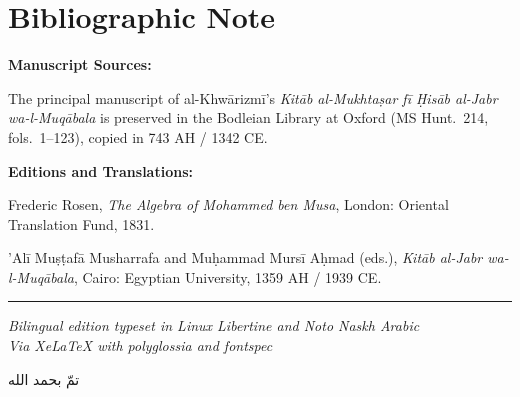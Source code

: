 \documentclass[11pt,a4paper,openany,oneside]{book}
\begin{document}
\chapter*{Bibliographic Note}

\begin{small}
\textbf{Manuscript Sources:}

The principal manuscript of al-Khw\=arizm\={i}'s \textit{Kit\=ab al-Mukhta\d{s}ar
f\={i} \d{H}is\=ab al-Jabr wa-l-Muq\=abala} is preserved in the Bodleian
Library at Oxford (MS Hunt.~214, fols.~1--123), copied in 743 AH / 1342 CE.

\vspace{0.3cm}

\textbf{Editions and Translations:}

\begin{enumerate}[label={[\arabic*]},leftmargin=2em]
  \item Frederic Rosen, \textit{The Algebra of Mohammed ben Musa}, London:
  Oriental Translation Fund, 1831.
  \item 'Al\={i} Mu\d{s}\d{t}af\=a Musharrafa and Mu\d{h}ammad Murs\={i} A\d{h}mad
  (eds.), \textit{Kit\=ab al-Jabr wa-l-Muq\=abala}, Cairo: Egyptian
  University, 1359 AH / 1939 CE.
\end{enumerate}
\end{small}

\vfill

\begin{center}
\rule{0.3\textwidth}{0.4pt}

\vspace{0.3cm}

{\small\textit{Bilingual edition typeset in Linux Libertine and Noto Naskh Arabic}}\\[0.1cm]
{\small\textit{Via XeLaTeX with polyglossia and fontspec}}

\vspace{0.3cm}

\begin{Arabic}
تمّ بحمد الله
\end{Arabic}
\end{center}
\end{document}

